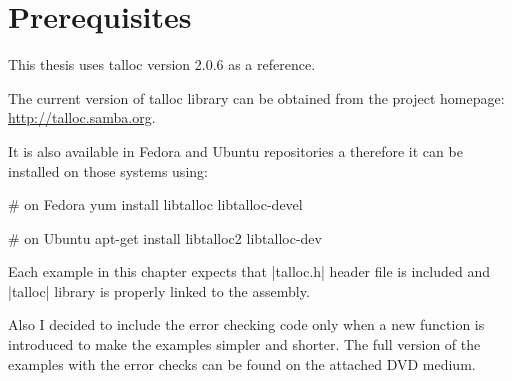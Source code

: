 \section{Prerequisites}
\label{talloc:prerequisites}

This thesis uses talloc version 2.0.6 as a reference.

The current version of talloc library can be obtained from the project homepage:
{\footnotesize\url{http://talloc.samba.org}}.

It is also available in Fedora and Ubuntu repositories a therefore it can be
installed on those systems using:

\begin{commandline}
# on Fedora
yum install libtalloc libtalloc-devel

# on Ubuntu
apt-get install libtalloc2 libtalloc-dev
\end{commandline}
\funclistend
Each example in this chapter expects that |talloc.h| header file is included and
|talloc| library is properly linked to the assembly.

Also I decided to include the error checking code only when a new function is
introduced to make the examples simpler and shorter. The full version of the
examples with the error checks can be found on the attached DVD medium.


